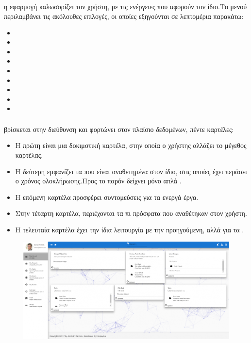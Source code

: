 \subsection{}
 η εφαρμογή καλωσορίζει τον χρήστη, με τις ενέργειες που αφορούν τον ίδιο.Το μενού περιλαμβάνει τις ακόλουθες επιλογές, οι οποίες εξηγούνται σε λεπτομέρια παρακάτω:\\
\begin{itemize}
	\item {}
	\item {}
	\item {}
	\item {}
	\item {}
	\item {}
	\item {}
	\item {}
	\item {}
\end{itemize} 

\subsubsection*{}
  βρίσκεται στην διεύθυνση  και φορτώνει στον πλαίσιο δεδομένων, πέντε καρτέλες:
\begin{itemize}
	\item Η πρώτη είναι μια δοκιμστική καρτέλα, στην οποία ο χρήστης αλλάζει το μέγεθος καρτέλας.
	\item Η δεύτερη εμφανίζει τα  που είναι αναθετημένα στον ίδιο, στις οποίες έχει περάσει ο χρόνος ολοκλήρωσης.Προς το παρόν δείχνει μόνο απλά .
	\item Η επόμενη καρτέλα προσφέρει συντομεύσεις για τα ενεργά έργα.
	\item Στην τέταρτη καρτέλα, περιέχονται τα πι πρόσφατα  που αναθέτηκαν στον χρήστη.
	\item Η τελευταία καρτέλα έχει την ίδια λειτουργία με την προηγούμενη, αλλά για τα .
\end{itemize}

\begin{figure}[!htb]
\centering
\includegraphics[scale=0.3]{images/userDashboard.png}
\caption{}
\label{fig:userDashboard}
\end{figure}

